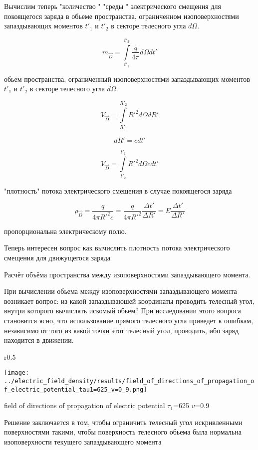 \documentclass{article}
\begin{document}
Вычислим теперь "количество " "среды " электрического смещения для покоящегося заряда в обьеме пространства, ограниченном изоповерхностями запаздывающих моментов  $t'_{1}$ и $t'_{2}$ в секторе телесного угла $d\Omega$.

$$m_{\vec D} = \int\limits_{t'_{1}}^{t'_{2}}\frac{q}{4\pi}d\Omega d t'$$

обьем пространства, ограниченный изоповерхностями запаздывающих моментов  $t'_{1}$ и $t'_{2}$ в секторе телесного угла $d\Omega$.

$$V_{\vec D} = \int\limits_{R'_{1}}^{R'_{2}}{R'}^2 d\Omega d R' $$


$$d R' = c d t'$$

$$V_{\vec D} = \int\limits_{t'_{2}}^{t'_{1}}{R'}^2 d \Omega c d t'$$


"плотность" потока электрического смещения в случае покоящегося заряда

$$\rho_{\vec D} = \frac{q}{4\pi {R'}^2 c} =  \frac{q}{4\pi {R'}^2}\frac{\Delta t'}{\Delta R'} = E\frac{\Delta t'}{\Delta R'}$$

пропорциональна электрическому полю.

Теперь интересен вопрос как вычислить плотность потока электрического смещения для движущегося заряда

Расчёт объёма пространства между изоповерхностями запаздывающего момента.

При вычислении обьема между изоповерхностями запаздывающего момента возникает вопрос: из какой запаздываюшей координаты проводить телесный угол, внутри которого вычислять искомый обьем? При исследовании этого вопроса становится ясно, что использование прямого телесного угла приведет к ошибкам, независимо от того из какой точки этот телесный угол, проводить, ибо заряд находится в движении. 


\begin{wrapfigure}{r}{0.5\textwidth}
\begin{center}
\texttt{[image: ../electric\_field\_density/results/field\_of\_directions\_of\_propagation\_of\_electric\_potential\_tau1=625\_v=0\_9.png]}
\caption{}{field of directions of propagation of electric potential $\tau_1$=625 $v$=0.9}
\end{center}
\end{wrapfigure}


Решение заключается в том, чтобы ограничить телесный угол искривленными поверхностями такими, чтобы поверхность телесного обьема была нормальна изоповерхности текущего запаздывающего момента
\end{document}
